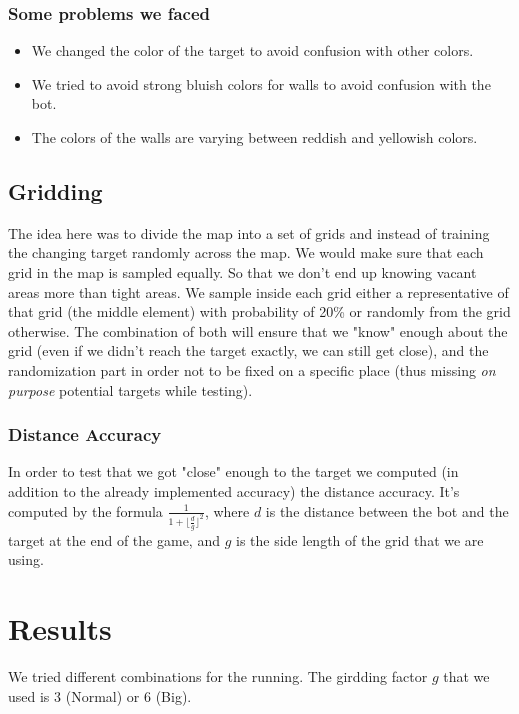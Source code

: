 \documentclass[a4paper]{article}
\begin{document}
\subsubsection{Some problems we faced}
\begin{itemize}
    \item We changed the color of the target to avoid confusion with other colors.
    \item We tried to avoid strong bluish colors for walls to avoid confusion with the bot.
    \item The colors of the walls are varying between reddish and yellowish colors.
\end{itemize}

\subsection{Gridding}
The idea here was to divide the map into a set of grids and instead of training the changing target randomly across the map.
We would make sure that each grid in the map is sampled equally. So that we don't end up knowing vacant areas more than tight areas.
We sample inside each grid either a representative of that grid (the middle element) with probability of 20\% or randomly from the grid otherwise. The combination of both will ensure that we "know" enough about the grid (even if we didn't reach the target exactly, we can still get close), and the randomization part in order not to be fixed on a specific place (thus missing {\it on purpose} potential targets while testing).

\subsubsection{Distance Accuracy}
In order to test that we got "close" enough to the target we computed (in addition to the already implemented accuracy) the distance accuracy.
It's computed by the formula $\frac{1}{1 + {\lfloor \frac{d}{g} \rfloor}^2}$, where $d$ is the distance between the bot and the target at the end of the game, and $g$ is the side length of the grid that we are using.

\section{Results}
We tried different combinations for the running. The girdding factor $g$ that we used is $3$ (Normal) or $6$ (Big).
\end{document}
